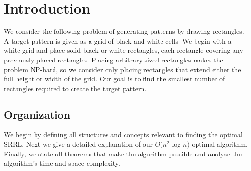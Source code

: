\section{Introduction}
We consider the following problem of generating patterns by drawing rectangles.
A target pattern is given as a grid of black and white cells.
We begin with a white grid and place solid black or white rectangles, each rectangle covering any previously placed rectangles.
Placing arbitrary sized rectangles makes the problem NP-hard, so we consider only placing rectangles that extend either the full height or width of the grid.
Our goal is to find the smallest number of rectangles required to create the target pattern.
\label{s_intro}





\subsection{Organization}
We begin by defining all structures and concepts relevant to finding the optimal SRRL.
Next we give a detailed explanation of our $O(n^2$ log $n)$ optimal algorithm.
Finally, we state all theorems that make the algorithm possible and analyze the algorithm's time and space complexity.
